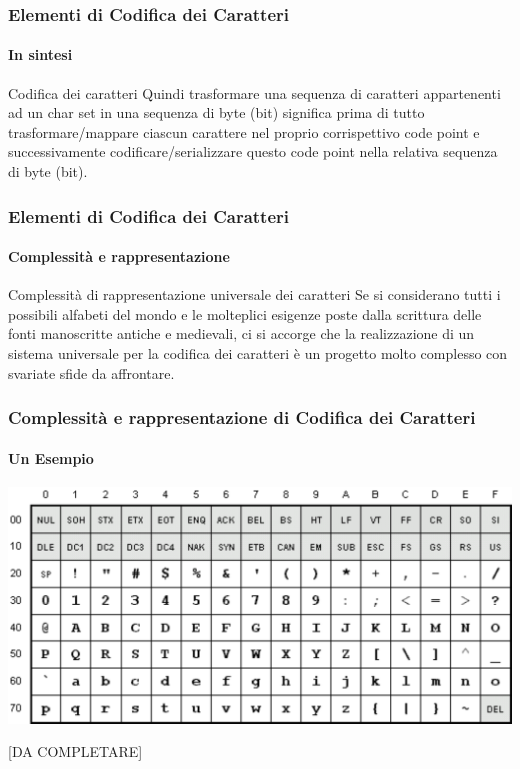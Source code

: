 \begin{frame}
	\frametitle{Elementi di Codifica dei Caratteri}
	\framesubtitle{In sintesi}
	\addtocounter{nframe}{1}


	\begin{block}{Codifica dei caratteri}
		Quindi trasformare una sequenza di caratteri appartenenti ad un char set in una sequenza di byte (bit) significa prima di tutto trasformare/mappare ciascun carattere nel proprio corrispettivo code point e successivamente codificare/serializzare questo code point nella relativa sequenza di byte (bit).
	\end{block}

\end{frame}


\begin{frame}
	\frametitle{Elementi di Codifica dei Caratteri}
	\framesubtitle{Complessità e rappresentazione}
	\addtocounter{nframe}{1}

	\begin{block}{Complessità di rappresentazione universale dei caratteri}
		Se si considerano tutti i possibili alfabeti del mondo e le molteplici esigenze poste dalla scrittura delle fonti manoscritte antiche e medievali, ci si accorge che la realizzazione di un sistema universale per la codifica dei caratteri è un progetto molto complesso con svariate sfide da affrontare.
	\end{block}

\end{frame}

\begin{frame}
	\frametitle{Complessità e rappresentazione di Codifica dei Caratteri}
	\framesubtitle{Un Esempio}
	\addtocounter{nframe}{1}

	\begin{center}
		\includegraphics[width=.9\textwidth]{imgs/ascii-67.pdf}
	\end{center}

	[DA COMPLETARE]

\end{frame}


